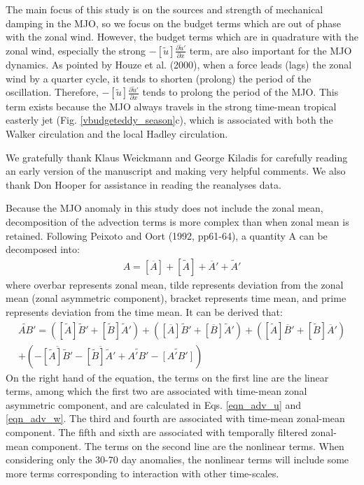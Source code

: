 \documentclass[12pt]{article}
\begin{document}
The main focus of this study is on the sources and strength of 
mechanical damping in the MJO,
so we focus on the budget terms which are out of phase with the zonal wind.
However, the budget terms which are in quadrature with the zonal wind,
especially the strong
$- [\widetilde{u}] \frac{\partial \widetilde{u} '}{\partial x}$
term, 
are also important for the MJO dynamics.
As pointed by Houze et al. (2000), 
when a force leads (lags) the zonal wind by a quarter cycle, 
it tends to shorten (prolong) the period of the oscillation.
Therefore, 
$- [\widetilde{u}] \frac{\partial \widetilde{u} '}{\partial x}$
tends to prolong the period of the MJO.
This term exists because the MJO always travels in 
the strong time-mean tropical easterly jet (Fig. \ref{vbudgeteddy_season}c),
which is associated with both the Walker circulation
and the local Hadley circulation.
\\


We gratefully thank Klaus Weickmann and George Kiladis for carefully reading 
an early version of the manuscript and making very helpful comments.
We also thank Don Hooper for assistance in reading the reanalyses data.
\\



Because the MJO anomaly in this study does not include the zonal mean,
decomposition of the advection terms is more complex than when zonal mean
is retained.
Following Peixoto and Oort (1992, pp61-64), a quantity A can be
decomposed into:
\renewcommand{\theequation}{A\arabic{equation}}
\setcounter{equation}{0}
\begin{eqnarray}
A = [\overline{A}] + [\widetilde{A}] + \overline{A} ' + \widetilde{A} '
\label{A1}
\end{eqnarray}
where overbar represents zonal mean, tilde represents
deviation from the zonal mean (zonal asymmetric component), 
bracket represents time mean, and prime represents deviation from the
time mean.
It can be derived that:
\begin{eqnarray}
\widetilde{AB} ' = 
([\widetilde{A}] \widetilde{B} ' + [\widetilde{B}] \widetilde{A} ') 
+ ([\overline{A}] \widetilde{B} '+ [\overline{B}] \widetilde{A} ')
+ ([\widetilde{A}] \overline{B} ' + [\widetilde{B}] \overline{A} ')
\nonumber
\\
+ (- \overline{[\widetilde{A}] \widetilde{B} '}
   - \overline{[\widetilde{B}] \widetilde{A} '}
   + \widetilde{A'B'}- \widetilde{[A'B']}) 
\label{A2}
\end{eqnarray}
On the right hand of the equation, the terms on the first line are the
linear terms, among which the first two are associated with time-mean
zonal asymmetric component, and are calculated in Eqs. \ref{eqn_adv_u}
and \ref{eqn_adv_w}.
The third and fourth are associated with time-mean zonal-mean component.
The fifth and sixth are associated with temporally filtered zonal-mean
component.
The terms on the second line are the nonlinear terms.
When considering only the 30-70 day anomalies, the nonlinear terms will
include some more terms corresponding to interaction with other time-scales.
\\
\end{document}
